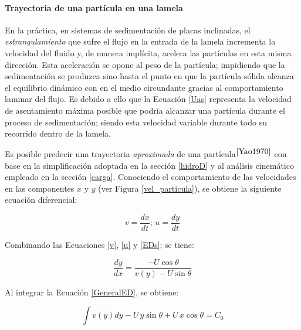 \paragraph{Trayectoria de una part\'icula en una lamela}

\noindent
\justify

En la pr\'actica, en sistemas de sedimentaci\'on de placas inclinadas, el \textit{estrangulamiento} que sufre el flujo en la entrada de la lamela incrementa la velocidad del fluido y, de manera impl\'icita, acelera las part\'iculas en esta misma direcci\'on. Esta aceleraci\'on se opone al peso de la part\'icula; impidiendo que la sedimentaci\'on se produzca sino hasta el punto en que la part\'icula s\'olida alcanza el equilibrio din\'amico con en el medio circundante gracias al comportamiento laminar del flujo. Es debido a ello que la Ecuaci\'on \ref{Uas} representa la velocidad de asentamiento m\'axima posible que podr\'ia alcanzar una part\'icula durante el proceso de sedimentaci\'on; siendo esta velocidad variable durante todo su recorrido dentro de la lamela.

\noindent
\justify

Es posible predecir una trayectoria \textit{aproximada} de una part\'icula$^{\cite{Yao1970}}$ con base en la simplificaci\'on adoptada en la secci\'on \ref{hidroD} y al an\'alisis cinem\'atico empleado en la secci\'on \ref{carga}. Conociendo el comportamiento de las velocidades en las componentes $x$ y $y$ (ver Figura \ref{vel_particula}), se obtiene la siguiente ecuaci\'on diferencial:

\begin{equation}
	v = \frac{dx}{dt}; \, u = \frac{dy}{dt}
	\label{EDs}
\end{equation}

\noindent
\justify

Combinando las Ecuaciones \ref{v}, \ref{u} y \ref{EDs}; se tiene:

\begin{equation}
	\frac{dy}{dx} = \frac{-U \cos \theta}{v(y)-U \sin \theta}
	\label{GeneralED}
\end{equation}

\noindent
\justify

Al integrar la Ecuaci\'on \ref{GeneralED}, se obtiene:

\begin{equation}
	\int v(y) dy - U \, y \sin \theta + U \, x \cos \theta = C_0
	\label{GeneralI}
\end{equation}

